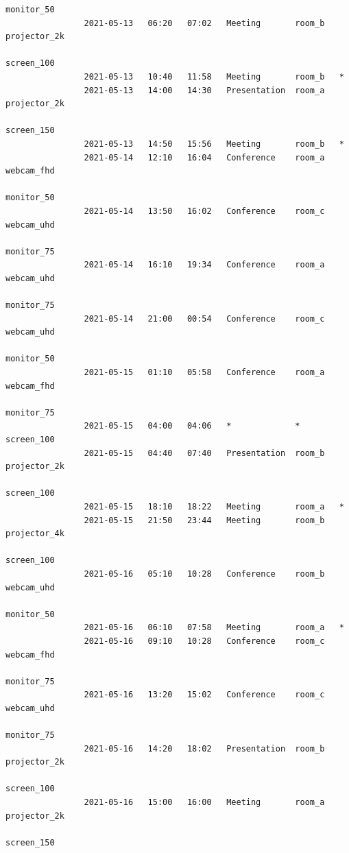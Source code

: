 \documentclass{article}
\begin{document}
\begin{Verbatim}[gobble=8]
                                                                    monitor_50
                2021-05-13   06:20   07:02   Meeting       room_b   projector_2k
                                                                    screen_100
                2021-05-13   10:40   11:58   Meeting       room_b   *
                2021-05-13   14:00   14:30   Presentation  room_a   projector_2k
                                                                    screen_150
                2021-05-13   14:50   15:56   Meeting       room_b   *
                2021-05-14   12:10   16:04   Conference    room_a   webcam_fhd
                                                                    monitor_50
                2021-05-14   13:50   16:02   Conference    room_c   webcam_uhd
                                                                    monitor_75
                2021-05-14   16:10   19:34   Conference    room_a   webcam_uhd
                                                                    monitor_75
                2021-05-14   21:00   00:54   Conference    room_c   webcam_uhd
                                                                    monitor_50
                2021-05-15   01:10   05:58   Conference    room_a   webcam_fhd
                                                                    monitor_75
                2021-05-15   04:00   04:06   *             *        screen_100
                2021-05-15   04:40   07:40   Presentation  room_b   projector_2k
                                                                    screen_100
                2021-05-15   18:10   18:22   Meeting       room_a   *
                2021-05-15   21:50   23:44   Meeting       room_b   projector_4k
                                                                    screen_100
                2021-05-16   05:10   10:28   Conference    room_b   webcam_uhd
                                                                    monitor_50
                2021-05-16   06:10   07:58   Meeting       room_a   *
                2021-05-16   09:10   10:28   Conference    room_c   webcam_fhd
                                                                    monitor_75
                2021-05-16   13:20   15:02   Conference    room_c   webcam_uhd
                                                                    monitor_75
                2021-05-16   14:20   18:02   Presentation  room_b   projector_2k
                                                                    screen_100
                2021-05-16   15:00   16:00   Meeting       room_a   projector_2k
                                                                    screen_150
                

\end{Verbatim}
\end{document}

